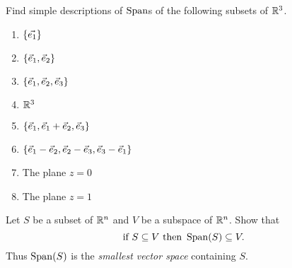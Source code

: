 \begin{qbox}
  \label{q:span}
  Find simple descriptions of $\operatorname{Span}$s of the following subsets of $\mathbb{R}^3$.
  \begin{multicols}{2}
    \begin{enumerate}
      \item $\left\{ \vec{e_1}\right\}$
      \item $\left\{\vec{e}_1, \vec{e}_{2}\right\}$
      \item $\left\{\vec{e}_1, \vec{e}_2 , \vec{e}_3\right\}$
      \item $\mathbb{R}^3$
      \item $\left\{\vec{e}_1,\vec{e}_1 + \vec{e}_2, \vec{e}_3\right\}$
      \item $\left\{\vec{e}_1-\vec{e}_2, \vec{e}_2-\vec{e}_3, \vec{e}_3-\vec{e}_1\right\}$
      \item The plane $z = 0$
      \item The plane $z = 1$
    \end{enumerate}
  \end{multicols}
\end{qbox}

\begin{qbox}
  Let $S$ be a subset of $\mathbb{R}^n$ and $V$ be a subspace of $\mathbb{R}^n$.
  Show that
  \begin{equation*}
    \mbox{if } S \subseteq V \mbox{ then }\operatorname{Span}(S) \subseteq V.
  \end{equation*}
  Thus $\operatorname{Span}(S)$ is the \emph{smallest vector space} containing $S$.
\end{qbox}


